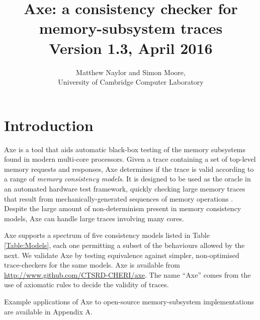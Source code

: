 \documentclass[11pt]{article}
\begin{document}
\title{{\bf Axe: a consistency checker for memory-subsystem traces}\\
{\large Version 1.3, April 2016}}
\author{Matthew Naylor and Simon Moore, \\
University of Cambridge Computer Laboratory}
\date{}
\maketitle

\tableofcontents

\newpage

\setlength{\parskip}{1em}
\renewcommand{\thefootnote}{\fnsymbol{footnote}}

\newcommand{\cmark}{\ding{51}}
\newcommand{\xmark}{\ding{55}}

\section{Introduction}

Axe is a tool that aids automatic black-box testing of the
memory subsystems found in modern multi-core processors.  Given a
trace containing a set of top-level memory requests and responses, Axe
determines if the trace is valid according to a range of \emph{memory
consistency models}.  It is designed to be used as the oracle in an
automated hardware test framework, quickly checking large memory
traces that result from mechanically-generated sequences of memory
operations \cite{BlueCheck}.
Despite
the large amount of non-determinism present in memory consistency
models, Axe can handle large traces involving many cores.

Axe supports a spectrum of five consistency models listed in Table
\ref{Table:Models}, each one permitting a subset of the behaviours
allowed by the next.
We validate Axe by testing equivalence against simpler, non-optimised
trace-checkers for the same models.
Axe is available from \url{http://www.github.com/CTSRD-CHERI/axe}.
The name ``Axe'' comes from the use of axiomatic rules to decide the
validity of traces.

Example applications of Axe to open-source memory-subsystem
implementations are available in Appendix A.
\end{document}
